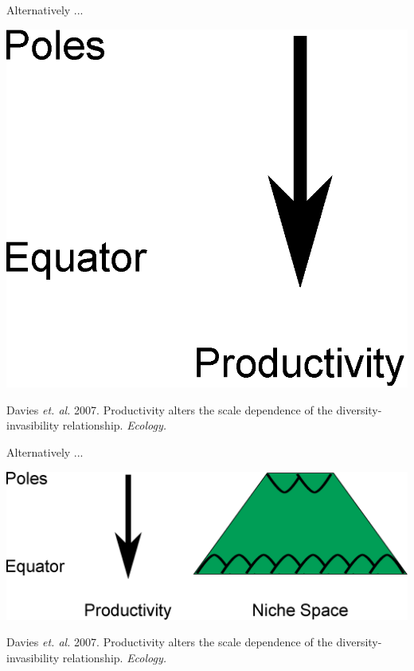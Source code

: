 \documentclass{beamer}
\begin{document}
  \begin{frame}{Alternatively ...}

    \begin{center}
      \includegraphics[width=.8\textwidth]{Figures/latitude_niche_breadth_4.eps}
    \end{center}

    \vspace{1.5cm}

    \tiny{Davies \emph{et. al.} 2007. Productivity alters the scale dependence of the diversity-invasibility relationship. \emph{Ecology.}}
  \end{frame}


  \begin{frame}{Alternatively ...}

    \begin{center}
      \includegraphics[width=.8\textwidth]{Figures/latitude_niche_breadth_5.eps}
    \end{center}

    \vspace{1.5cm}

    \tiny{Davies \emph{et. al.} 2007. Productivity alters the scale dependence of the diversity-invasibility relationship. \emph{Ecology.}}
  \end{frame}
\end{document}
